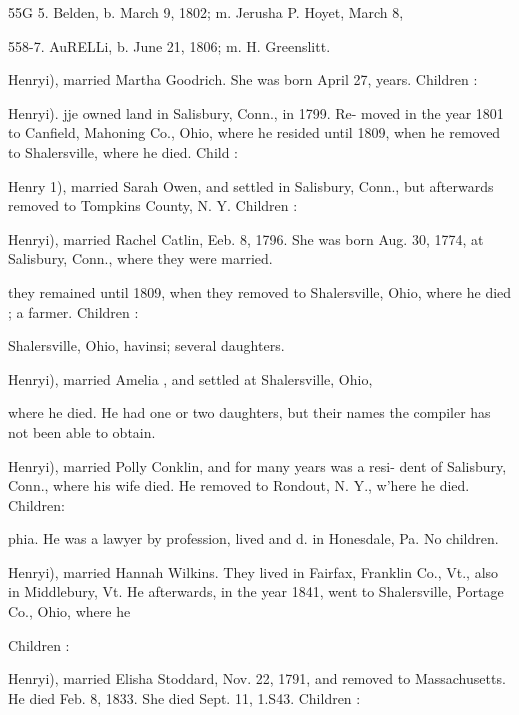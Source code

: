 \documentclass[oneside]{book}
\begin{document}
55G 5. Belden, b. March 9, 1802; m. Jerusha P. Hoyet, March 8, 


558-7. AuRELLi, b. June 21, 1806; m. H. Greenslitt. 


Henryi), married Martha Goodrich. She was born April 27, 
years. Children : 










Henryi). jje owned land in Salisbury, Conn., in 1799. Re- 
moved in the year 1801 to Canfield, Mahoning Co., Ohio, where 
he resided until 1809, when he removed to Shalersville, where he 
died. Child : 


Henry 1), married Sarah Owen, and settled in Salisbury, Conn., 
but afterwards removed to Tompkins County, N. Y. Children : 


Henryi), married Rachel Catlin, Eeb. 8, 1796. She was born 
Aug. 30, 1774, at Salisbury, Conn., where they were married. 




they remained until 1809, when they removed to Shalersville, 
Ohio, where he died ; a farmer. Children : 


Shalersville, Ohio, havinsi; several daughters. 





Henryi), married Amelia , and settled at Shalersville, Ohio, 

where he died. He had one or two daughters, but their names 
the compiler has not been able to obtain. 


Henryi), married Polly Conklin, and for many years was a resi- 
dent of Salisbury, Conn., where his wife died. He removed to 
Rondout, N. Y., w'here he died. Children: 






phia. He was a lawyer by profession, lived and d. in 
Honesdale, Pa. No children. 

Henryi), married Hannah Wilkins. They lived in Fairfax, 
Franklin Co., Vt., also in Middlebury, Vt. He afterwards, in 
the year 1841, went to Shalersville, Portage Co., Ohio, where he 

Children : 








Henryi), married Elisha Stoddard, Nov. 22, 1791, and removed 
to Massachusetts. He died Feb. 8, 1833. She died Sept. 11, 
1.S43. Children : 
\end{document}
